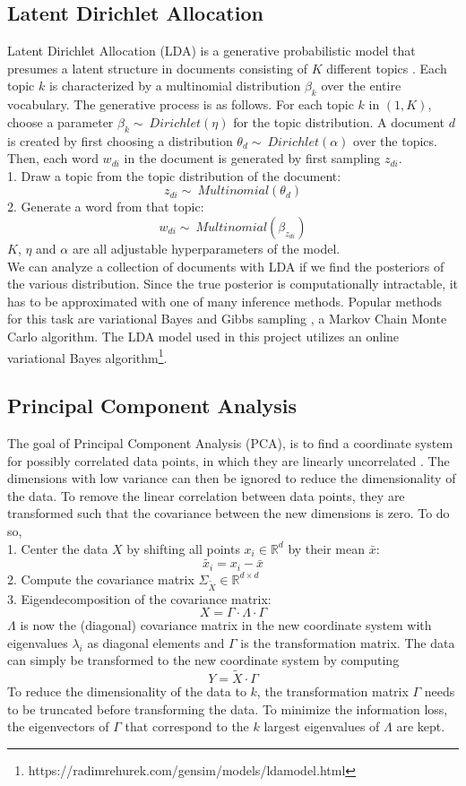 \documentclass[conference]{IEEEtran}
\begin{document}
\subsection{Latent Dirichlet Allocation} \label{sec:lda}
Latent Dirichlet Allocation (LDA) is a generative probabilistic model that presumes a latent structure in documents consisting of $K$ different topics \cite{hoffman}. Each topic $k$ is characterized by a multinomial distribution $\beta_k$ over the entire vocabulary. The generative process is as follows. For each topic $k$ in $(1,K)$, choose a parameter ${\beta_k \sim\ Dirichlet(\eta)}$ for the topic distribution. A document $d$ is created by first choosing a distribution ${\theta_d \sim\ Dirichlet(\alpha)}$ over the topics. Then, each word $w_{di}$ in the document is generated by first sampling $z_{di}$.\\
1. Draw a topic from the topic distribution of the document:
$${z_{di} \sim\ Multinomial(\theta_d)}$$
2. Generate a word from that topic:
$${w_{di} \sim\ Multinomial(\beta_{z_{di}})}$$
$K$, $\eta$ and $\alpha$ are all adjustable hyperparameters of the model.\\
We can analyze a collection of documents with LDA if we find the posteriors of the various distribution. Since the true posterior is computationally intractable, it has to be approximated with one of many inference methods. Popular methods for this task are variational Bayes \cite{blei} and Gibbs sampling \cite{griffiths}, a Markov Chain Monte Carlo algorithm. The LDA model used in this project utilizes an online variational Bayes algorithm\footnote{https://radimrehurek.com/gensim/models/ldamodel.html}.

\subsection{Principal Component Analysis}
The goal of Principal Component Analysis (PCA), is to find a coordinate system for possibly correlated data points, in which they are linearly uncorrelated \cite{pca_leskovec, pca_jolliffe}. The dimensions with low variance can then be ignored to reduce the dimensionality of the data. To remove the linear correlation between data points, they are transformed such that the covariance between the new dimensions is zero. To do so,\\
1. Center the data $X$ by shifting all points $x_i \in \mathbb{R}^d$ by their mean $\bar{x}$: $${\widetilde{x_i} = x_i - \bar{x}}$$
2. Compute the covariance matrix $\Sigma_{\widetilde{X}} \in \mathbb{R}^{d{\times}d}$\\
3. Eigendecomposition of the covariance matrix: $$X = \Gamma \cdot \Lambda \cdot \Gamma$$
$\Lambda$ is now the (diagonal) covariance matrix in the new coordinate system with eigenvalues $\lambda_i$ as diagonal elements and $\Gamma$ is the transformation matrix. The data can simply be transformed to the new coordinate system by computing $${Y = \widetilde{X} \cdot \Gamma}$$
To reduce the dimensionality of the data to $k$, the transformation matrix $\Gamma$ needs to be truncated before transforming the data. To minimize the information loss, the eigenvectors of $\Gamma$ that correspond to the $k$ largest eigenvalues of $\Lambda$ are kept.
\end{document}
